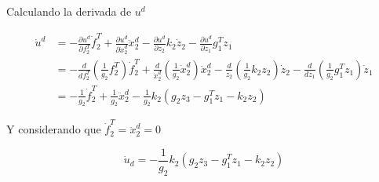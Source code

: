 Calculando la derivada de $u^d$

\begin{align}
    \dot u^d &= - \frac{\partial u^d}{\partial{f_2^T}}  \dot f_2^T + \frac{\partial u^d}{\partial{\dot x_2^d}} \ddot x_2^d - \frac{\partial u^d}{\partial{z_2}} k_2 \dot z_2 - \frac{\partial u^d}{\partial{z_1}} g_1^T z_1 \nonumber \\
    &= - \frac{d}{df_2^T}(\frac{1}{g_2}f_2^T) \dot f_2^T + \frac{d}{\dot x_2^d} (\frac{1}{g_2}\dot x_2^d) \ddot x_2^d - \frac{d}{ z_2}(\frac{1}{g_2}k_2 z_2) \dot z_2 - \frac{d}{d z_1}  (\frac{1}{g_2} g_1^T z_1) \dot z_1 \nonumber \\
    &= -\frac{1}{g_2} \dot f_2^T + \frac{1}{g_2} \ddot x_2^d - \frac{1}{g_2} k_2 (g_2 z_3 - g_1^T z_1 - k_2 z_2) 
\end{align}

Y considerando que $\dot f_2^T=\ddot x_2^d=0$ 

\begin{equation}
\label{derivada control 2}
    \dot u_d = - \frac{1}{g_2} k_2 (g_2 z_3 - g_1^T z_1 - k_2 z_2)
\end{equation}

%
%
%
%
%
%
%
%

